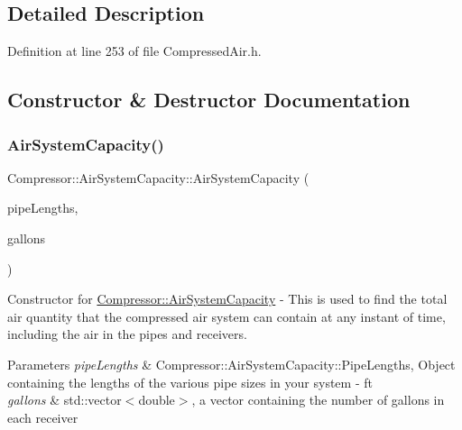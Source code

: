 \subsection{Detailed Description}


Definition at line 253 of file Compressed\+Air.\+h.



\subsection{Constructor \& Destructor Documentation}
\mbox{\label{class_compressor_1_1_air_system_capacity_a270fa85146172b46703970a1bc8fe724}} 
\subsubsection{\texorpdfstring{Air\+System\+Capacity()}{AirSystemCapacity()}\hspace{0.1cm}{\footnotesize\ttfamily [1/3]}}
{\footnotesize\ttfamily Compressor\+::\+Air\+System\+Capacity\+::\+Air\+System\+Capacity (\begin{DoxyParamCaption}\item[{\hyperlink{struct_compressor_1_1_pipe_data}{Compressor\+::\+Pipe\+Data}}]{pipe\+Lengths,  }\item[{std\+::vector$<$ double $>$}]{gallons }\end{DoxyParamCaption})}

Constructor for \hyperlink{class_compressor_1_1_air_system_capacity}{Compressor\+::\+Air\+System\+Capacity} -\/ This is used to find the total air quantity that the compressed air system can contain at any instant of time, including the air in the pipes and receivers. 
\begin{DoxyParams}{Parameters}
{\em pipe\+Lengths} & Compressor\+::\+Air\+System\+Capacity\+::\+Pipe\+Lengths, Object containing the lengths of the various pipe sizes in your system -\/ ft \\
\hline
{\em gallons} & std\+::vector$<$double$>$, a vector containing the number of gallons in each receiver \\
\hline
\end{DoxyParams}



